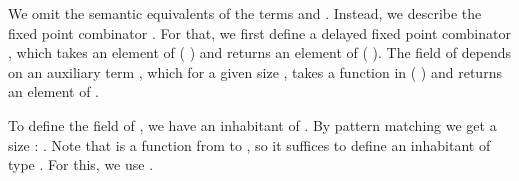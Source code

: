 We omit the semantic equivalents of the terms  and .
Instead, we describe the fixed point combinator .
For that, we first define a delayed fixed point combinator , which takes an element of   (   ) and returns an element of   ( ).
The field  of   depends on an auxiliary term , which for a given size , takes a function  in  ( )  and returns an element of  .

To define the  field of  , we have an inhabitant of  .
By pattern matching we get a size  :  .
Note that    is a function from    to   , so it suffices to define an inhabitant of type   .
For this, we use    .

